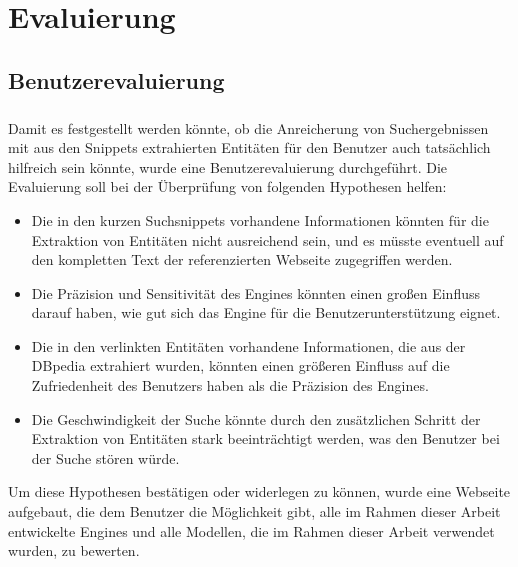 \chapter{Evaluierung}

\section{Benutzerevaluierung}
\paragraph{}
Damit es festgestellt werden könnte, ob die Anreicherung von Suchergebnissen mit aus den Snippets extrahierten Entitäten für den Benutzer auch tatsächlich hilfreich sein könnte, wurde eine Benutzerevaluierung durchgeführt. Die Evaluierung soll bei der Überprüfung von folgenden Hypothesen helfen:

\begin{itemize}
\item Die in den kurzen Suchsnippets vorhandene Informationen könnten für die Extraktion von Entitäten nicht ausreichend sein, und es müsste eventuell auf den kompletten Text der referenzierten Webseite zugegriffen werden.
\item Die Präzision und Sensitivität des Engines könnten einen großen Einfluss darauf haben, wie gut sich das Engine für die Benutzerunterstützung eignet.
\item Die in den verlinkten Entitäten vorhandene Informationen, die aus der DBpedia extrahiert wurden, könnten einen größeren Einfluss auf die Zufriedenheit des Benutzers haben als die Präzision des Engines.
\item Die Geschwindigkeit der Suche könnte durch den zusätzlichen Schritt der Extraktion von Entitäten stark beeinträchtigt werden, was den Benutzer bei der Suche stören würde.
\end{itemize}

Um diese Hypothesen bestätigen oder widerlegen zu können, wurde eine Webseite aufgebaut, die dem Benutzer die Möglichkeit gibt, alle im Rahmen dieser Arbeit entwickelte Engines und alle Modellen, die im Rahmen dieser Arbeit verwendet wurden, zu bewerten. 

